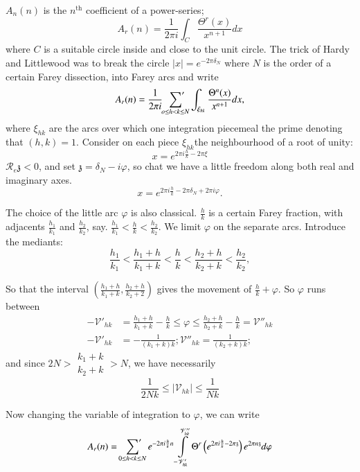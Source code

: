 $A_n(n)$ is the $n^{\text{th}}$ coefficient of a power-series;
$$
A_r(n) = \frac{1}{2 \pi i} \int_C \frac{\Theta^r (x)}{x^{n+1}} dx
$$
where $C$ is a suitable circle inside and close to the unit
circle. The trick of Hardy and Littlewood was to break the circle
$|x|=e^{- 2\pi \delta_N}$ where $N$ is the order of a certain Farey
dissection, into Farey arcs and write
$$
A_r (n) = \frac{1}{2 \pi i} \sideset{}{'}\sum_{o \leq h < k \leq N} \int_{\xi_{hk}}
\frac{\Theta^n(x)}{x^{n+1}} dx,
$$
where $\xi_{hk}$ are the arcs over which one integration piecemeal the
prime denoting that $(h, k)=1$. Consider on each piece $\xi_{hk}$\pageoriginale the
neighbourhood of a root of unity: 
$$
x= e^{2 \pi i \frac{h}{k}- 2 \pi \xi} 
$$
$\mathscr{R}_e \mathfrak{z}<0$, and set $\mathfrak{z}= \delta_N- i \varphi$,
so chat we have a little freedom along both real and imaginary axes.
$$
x= e^{2 \pi i \frac{h}{k} - 2 \pi \delta_N + 2 \pi i \varphi}.
$$

The choice of the little arc $\varphi$ is also
classical. $\frac{h}{k}$ is a certain Farey fraction, with adjacents
$\frac{h_1}{k_1}$ and $\frac{h_2}{k_2}$, say. $\frac{h_1}{k_1} <
\frac{h}{k} < \frac{h_2}{k_2}$. We limit $\varphi$ on the separate
  arcs. Introduce the mediants:
$$
\frac{h_1}{k_1} < \frac{h_1+h}{k_1 +k} < \frac{h}{k} <
\frac{h_2+h}{k_2+k} < \frac{h_2}{k_2},
$$ 

So that the interval $\left( \frac{h_1 +h}{k_1+k} , \frac{h_2+
  h}{k_2+2}\right)$ gives the movement of $\frac{h}{k} + \varphi$. So $\varphi$
runs between
\begin{align*}
  - \mathscr{V}'_{hk} & = \frac{h_1 +h}{k_1+ k} - \frac{h}{k} \leq
  \varphi \leq \frac{h_2+ h}{h_2+k}- \frac{h}{k}= \mathscr{V}''_{hk}\\
  - \mathscr{V}'_{hk} & = - \frac{1}{(k_1 + k)k}; \mathscr{V}''_{hk}=
  \frac{1}{(k_2 +k)k} ;
\end{align*}
and since $2N > \begin{smallmatrix} k_1+ k\\ k_2+k \end{smallmatrix}>
N$, we have necessarily
$$
\frac{1}{2 Nk} \leq |\mathscr{V}_{hk}| \leq \frac{1}{Nk}
$$

Now changing the variable of integration to $\varphi$, we can write
$$
A_r(n) = \sideset{}{'}\sum_{0 \leq h < k \leq N} e^{-2 \pi i \frac{h}{k} n}
\int\limits^{\mathscr{V}''_{hk}}_{-\mathscr{V}'_{hk}} \Theta^r
\left(e^{2 \pi i \frac{h}{k} - 2 \pi \mathfrak{z}} \right) e^{2 \pi n
  \mathfrak{z}} d \varphi
$$\pageoriginale

